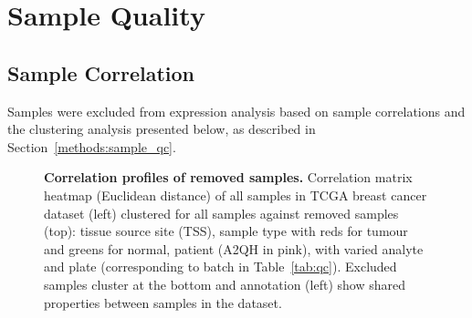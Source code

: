 



\chapter{Sample Quality}
\label{appendix:sample_checking}

\section{Sample Correlation}
\label{appendix:sample_correlation}

Samples were excluded from expression analysis based on sample correlations and the clustering analysis presented below, as described in Section~\ref{methods:sample_qc}.  

\begin{figure}[!ht]
  \begin{center}
   \end{center}
   \caption[Correlation profiles of removed samples]{\small \textbf{Correlation profiles of removed samples.} Correlation matrix heatmap (Euclidean distance) of all samples in \gls{TCGA} breast cancer dataset (left) clustered for all samples against removed samples (top): tissue source site (TSS), sample type with reds for tumour and greens for normal, patient (A2QH in pink), with varied analyte and plate (corresponding to batch in Table~\ref{tab:qc}). Excluded samples cluster at the bottom and annotation (left) show  shared properties between samples in the dataset.
   }
\label{fig:corr_map_part}
\end{figure}

